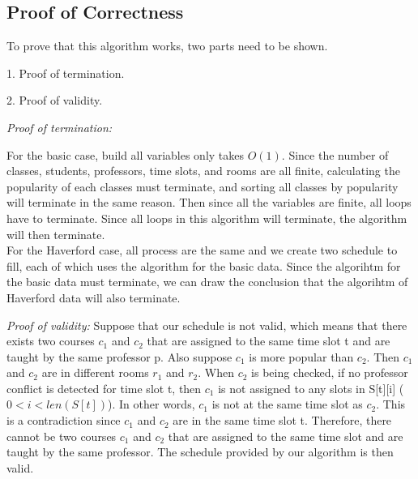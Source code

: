 \documentclass[11pt, oneside]{article}   	%
\begin{document}
\subsection{Proof of Correctness}
To prove that this algorithm works, two parts need to be shown.

1. Proof of termination.

2. Proof of validity.

\textit{Proof of termination:}

For the basic case, build all variables only takes $O(1)$. Since the number of classes, students, professors, time slots, and rooms are all finite, calculating the popularity of each classes must terminate, and sorting all classes by popularity will terminate in the same reason. Then since all the variables are finite, all loops have to terminate. Since all loops in this algorithm will terminate, the algorithm will then terminate. \\

For the Haverford case, all process are the same and we create two schedule to fill, each of which uses the algorithm for the basic data. Since the algorihtm for the basic data must terminate, we can draw the conclusion that the algorihtm of Haverford data will also terminate.

\textit{Proof of validity:}
Suppose that our schedule is not valid, which means that there exists two courses $c_1$ and $c_2$ that are assigned to the same time slot t and are taught by the same professor p. Also suppose $c_1$ is more popular than $c_2$. Then $c_1$ and $c_2$ are in different rooms $r_1$ and $r_2$. 
When $c_2$ is being checked, if no professor conflict is detected for time slot t, then $c_1$ is not assigned to any slots in S[t][i] ($0< i < len(S[t])$). In other words, $c_1$ is not at the same time slot as $c_2$. This is a contradiction since $c_1$ and $c_2$ are in the same time slot t.
Therefore, there cannot be two courses $c_1$ and $c_2$ that are assigned to the same time slot and are taught by the same professor. The schedule provided by our algorithm is then valid.

\end{document}
